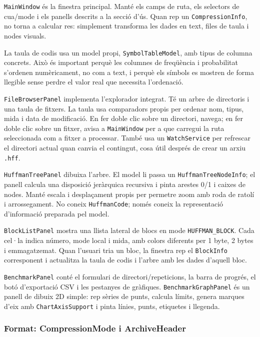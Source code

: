 \documentclass[conference,compsoc]{IEEEtran}
\begin{document}
\texttt{MainWindow} és la finestra principal. Manté els camps de ruta, els
selectors de cua/mode i els panells descrits a la secció d'ús. Quan rep
un \texttt{CompressionInfo}, no torna a calcular res: simplement transforma
les dades en text, files de taula i nodes visuals.

La taula de codis usa un model propi, \texttt{SymbolTableModel}, amb
tipus de columna concrets. Això és important perquè les columnes de
freqüència i probabilitat s'ordenen numèricament, no com a text, i perquè
els símbols es mostren de forma llegible sense perdre el valor real que
necessita l'ordenació.

\texttt{FileBrowserPanel} implementa l'explorador integrat. Té un arbre de
directoris i una taula de fitxers. La taula usa comparadors propis per
ordenar nom, tipus, mida i data de modificació. En fer doble clic sobre
un directori, navega; en fer doble clic sobre un fitxer, avisa a
\texttt{MainWindow} per a que carregui la ruta seleccionada com a fitxer a processar.
També usa un \texttt{WatchService} per refrescar el directori actual quan canvia el
contingut, cosa útil després de crear un arxiu \texttt{.hff}.

\texttt{HuffmanTreePanel} dibuixa l'arbre. El model li passa un
\texttt{HuffmanTreeNodeInfo}; el panell calcula una disposició jeràrquica
recursiva i pinta arestes 0/1 i caixes de nodes. Manté escala i
desplaçament propis per permetre zoom amb roda de ratolí i arrossegament.
No coneix \texttt{HuffmanCode}; només coneix la representació d'informació
preparada pel model.

\texttt{BlockListPanel} mostra una llista lateral de blocs en mode
\texttt{HUFFMAN\_BLOCK}. Cada cel·la indica número, mode local i mida, amb
colors diferents per 1 byte, 2 bytes i emmagatzemat. Quan l'usuari tria
un bloc, la finestra rep el \texttt{BlockInfo} corresponent i actualitza
la taula de codis i l'arbre amb les dades d'aquell bloc.

\texttt{BenchmarkPanel} conté el formulari de directori/repeticions, la barra
de progrés, el botó d'exportació CSV i les pestanyes de gràfiques.
\texttt{BenchmarkGraphPanel} és un panell de dibuix 2D simple: rep sèries
de punts, calcula límits, genera marques d'eix amb \texttt{ChartAxisSupport}
i pinta línies, punts, etiquetes i llegenda.

\subsubsection{Format: CompressionMode i ArchiveHeader}
\end{document}
